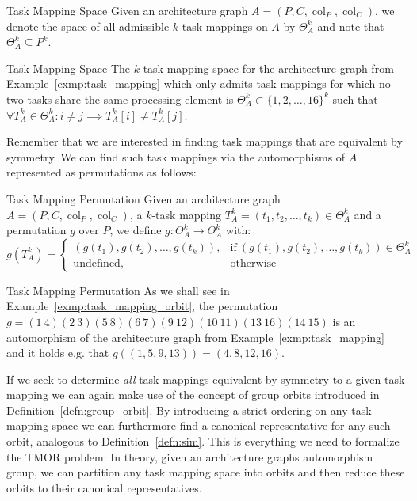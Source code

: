 \begin{defn}{Task Mapping Space}
  Given an architecture graph $A = (P,C, \operatorname{col}_P,
  \operatorname{col}_C)$, we denote the space of all admissible $k$-task mappings
  on $A$ by $\Theta_A^k$ and note that $\Theta_A^k \subseteq P^k$.
\end{defn}

\begin{exmp}[label=exmp:task_mapping_space]{Task Mapping Space}
  The $k$-task mapping space for the architecture graph from
  Example~\ref{exmp:task_mapping} which only admits task mappings for which no
  two tasks share the same processing element is $\Theta_A^k \subset
  \{1,2,\dots,16\}^k$ such that $\forall T_A^k \in \Theta_A^k: i \neq j \implies
  T_{A}^k[i] \neq T_{A}^k[j]$.
\end{exmp}
%
Remember that we are interested in finding task mappings that are equivalent by
symmetry. We can find such task mappings via the automorphisms of $A$
represented as permutations as follows:

\begin{defn}{Task Mapping Permutation}
  Given an architecture graph $A = (P,C, \operatorname{col}_P,
  \operatorname{col}_C)$, a $k$-task mapping $T_A^k = (t_1, t_2, \dots, t_k) \in
  \Theta_A^k$ and a permutation $g$ over $P$, we define $g: \Theta_A^k \to
  \Theta_A^k$ with:
  \begin{equation*}
     g(T_A^k) = \begin{cases}
                   (g(t_1), g(t_2), \dots, g(t_k)),
                     &\text{if}\ (g(t_1), g(t_2), \dots, g(t_k)) \in \Theta_A^k \\
                   \text{undefined},
                     &\text{otherwise}
                 \end{cases}
  \end{equation*}
\end{defn}

\begin{exmp}{Task Mapping Permutation}
  As we shall see in Example~\ref{exmp:task_mapping_orbit}, the permutation $g
  = (1\ 4)(2\ 3) (5\ 8)(6\ 7)(9\ 12)(10\ 11)(13\ 16)(14\ 15)$ is an automorphism
  of the architecture graph from Example~\ref{exmp:task_mapping} and it holds
  e.g. that $g((1,5,9,13)) = (4,8,12,16)$.
\end{exmp}
%
If we seek to determine \textit{all} task mappings equivalent by symmetry to a
given task mapping we can again make use of the concept of group orbits
introduced in Definition~\ref{defn:group_orbit}. By introducing a strict
ordering on any task mapping space we can furthermore find a canonical
representative for any such orbit, analogous to Definition~\ref{defn:sim}. This
is everything we need to formalize the TMOR problem: In theory, given an
architecture graphs automorphism group, we can partition any task mapping space
into orbits and then reduce these orbits to their canonical representatives.


